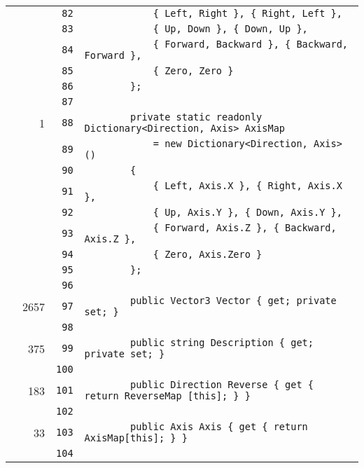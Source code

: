 \documentclass[a4paper,10pt]{article}
\begin{document}
\begin{longtable}[l]{lrrl}
\cellcolor{gray} &  & \verb~82~ & \verb~            { Left, Right }, { Right, Left },~\\
\cellcolor{gray} &  & \verb~83~ & \verb~            { Up, Down }, { Down, Up },~\\
\cellcolor{gray} &  & \verb~84~ & \verb~            { Forward, Backward }, { Backward, Forward },~\\
\cellcolor{gray} &  & \verb~85~ & \verb~            { Zero, Zero }~\\
\cellcolor{gray} &  & \verb~86~ & \verb~        };~\\
\cellcolor{gray} &  & \verb~87~ & \verb~~\\
\cellcolor{green} & 1 & \verb~88~ & \verb~        private static readonly Dictionary<Direction, Axis> AxisMap~\\
\cellcolor{gray} &  & \verb~89~ & \verb~            = new Dictionary<Direction, Axis> ()~\\
\cellcolor{gray} &  & \verb~90~ & \verb~        {~\\
\cellcolor{gray} &  & \verb~91~ & \verb~            { Left, Axis.X }, { Right, Axis.X },~\\
\cellcolor{gray} &  & \verb~92~ & \verb~            { Up, Axis.Y }, { Down, Axis.Y },~\\
\cellcolor{gray} &  & \verb~93~ & \verb~            { Forward, Axis.Z }, { Backward, Axis.Z },~\\
\cellcolor{gray} &  & \verb~94~ & \verb~            { Zero, Axis.Zero }~\\
\cellcolor{gray} &  & \verb~95~ & \verb~        };~\\
\cellcolor{gray} &  & \verb~96~ & \verb~~\\
\cellcolor{green} & 2657 & \verb~97~ & \verb~        public Vector3 Vector { get; private set; }~\\
\cellcolor{gray} &  & \verb~98~ & \verb~~\\
\cellcolor{green} & 375 & \verb~99~ & \verb~        public string Description { get; private set; }~\\
\cellcolor{gray} &  & \verb~100~ & \verb~~\\
\cellcolor{green} & 183 & \verb~101~ & \verb~        public Direction Reverse { get { return ReverseMap [this]; } }~\\
\cellcolor{gray} &  & \verb~102~ & \verb~~\\
\cellcolor{green} & 33 & \verb~103~ & \verb~        public Axis Axis { get { return AxisMap[this]; } }~\\
\cellcolor{gray} &  & \verb~104~ & \verb~~\\

\end{longtable}
\end{document}
